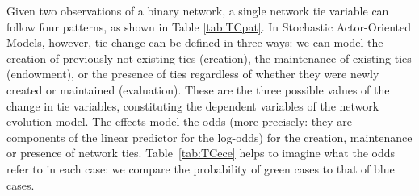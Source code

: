 \documentclass[a4paper,fleqn,11pt]{article}
\newcommand{\+}{\, + \,}
\newcommand{\saom}{{Stochastic Actor-Oriented Model}}
\begin{document}
Given two observations of a binary network, a single network tie variable
can follow four patterns, as shown in Table \ref{tab:TCpat}.
In {\saom}s, however, tie change can be
defined in three ways: we can model the creation of previously not
existing ties (creation), the maintenance of existing ties (endowment),
or the presence of ties regardless of whether they were newly created
or maintained (evaluation). These are the three possible values of the
change in tie variables, constituting the dependent
variables of the network evolution model.
The effects model the odds
(more precisely: they are components of the linear
predictor for the log-odds)
for the creation, maintenance or
presence of network ties. Table~\ref{tab:TCece} helps to imagine
what the odds refer to in each case: we compare the probability of
green cases to that of blue cases.
\end{document}
